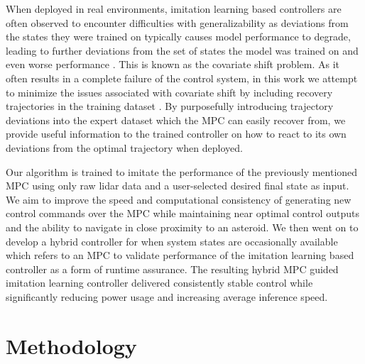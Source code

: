 \documentclass[twocolumn,letterpaper]{IEEEAerospaceCLS}
\begin{document}
When deployed in real environments, imitation learning based controllers are often observed to encounter difficulties with generalizability as deviations from the states they were trained on typically causes model performance to degrade, leading to further deviations from the set of states the model was trained on and even worse performance \cite{Alexander2024-my,Pan2020-rt}. This is known as the covariate shift problem. As it often results in a complete failure of the control system, in this work we attempt to minimize the issues associated with covariate shift by including recovery trajectories in the training dataset \cite{Alexander2024-my,Codevilla2018-sq}. By purposefully introducing trajectory deviations into the expert dataset which the MPC can easily recover from, we provide useful information to the trained controller on how to react to its own deviations from the optimal trajectory when deployed.

Our algorithm is trained to imitate the performance of the previously mentioned MPC using only raw lidar data and a user-selected desired final state as input. We aim to improve the speed and computational consistency of generating new control commands over the MPC while maintaining near optimal control outputs and the ability to navigate in close proximity to an asteroid. We then went on to develop a hybrid controller for when system states are occasionally available which refers to an MPC to validate performance of the imitation learning based controller as a form of runtime assurance. The resulting hybrid MPC guided imitation learning controller delivered consistently stable control while significantly reducing power usage and increasing average inference speed. 

\section{Methodology}
\end{document}
